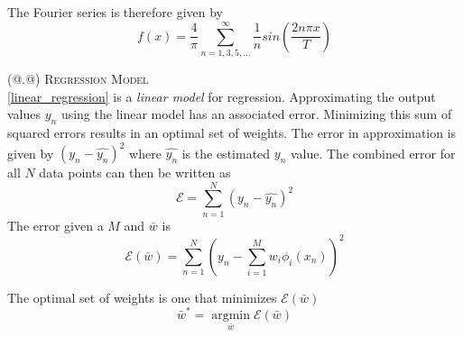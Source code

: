 \documentclass[a4paper,12pt]{article}
\makeatletter
\newcommand*{\rom}[1]{\expandafter\@slowromancap\romannumeral #1@}
\makeatother
\begin{document}
The Fourier series is therefore given by
\begin{equation}\label{eqn:infinite_fourier_square}
 f(x) = \frac{4}{\pi} \sum_{n=1,3,5,\ldots}^{\infty}\frac{1}{n}sin\left(\frac{2n\pi x}{T}\right)
\end{equation}

\noindent (\rom{2}.\rom{3}) \textsc{Regression Model} \\
\hspace*{5mm} \eqref{linear_regression} is a \textit{linear model} for regression. Approximating the output values ${y_n}$ using the linear model has an associated error. Minimizing this sum of squared errors results in an optimal set of weights. The error in approximation is given by $(y_n-\hat{y_n})^2$ where $\hat{y_n}$ is the estimated $y_n$ value. The combined error for all $N$ data points can then be written as
\begin{equation} \label{eqn:squared_error}
 \mathcal{E} = \sum_{n=1}^N (y_n-\hat{y_n})^2
\end{equation} 
The error given a $M$ and $\bar{w}$ is 
\begin{equation}
 \mathcal{E}(\bar{w}) = \sum_{n=1}^N (y_n-\sum_{i=1}^M w_i \phi_i(x_n))^2
\end{equation} 

The optimal set of weights is one that minimizes $\mathcal{E}(\bar{w})$
\[ \bar{w}^* = \displaystyle\operatorname*{argmin}_{\bar{w}} \mathcal{E}(\bar{w}) \]
\end{document}
